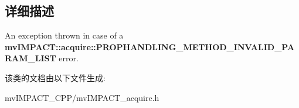 \subsection{详细描述}
An exception thrown in case of a {\bfseries mv\+I\+M\+P\+A\+C\+T\+::acquire\+::\+P\+R\+O\+P\+H\+A\+N\+D\+L\+I\+N\+G\+\_\+\+M\+E\+T\+H\+O\+D\+\_\+\+I\+N\+V\+A\+L\+I\+D\+\_\+\+P\+A\+R\+A\+M\+\_\+\+L\+I\+S\+T} error. 

该类的文档由以下文件生成\+:\begin{DoxyCompactItemize}
\item 
mv\+I\+M\+P\+A\+C\+T\+\_\+\+C\+P\+P/mv\+I\+M\+P\+A\+C\+T\+\_\+acquire.\+h\end{DoxyCompactItemize}
